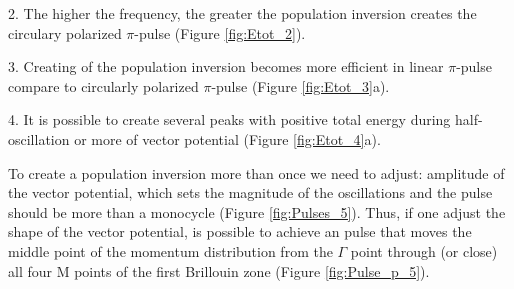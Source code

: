 2. The higher the frequency, the greater the population inversion creates the circulary polarized $\pi$-pulse (Figure \ref{fig:Etot_2}).

3. Creating of the population inversion becomes more efficient in linear $\pi$-pulse compare to circularly polarized $\pi$-pulse (Figure \ref{fig:Etot_3}a).

4. It is possible to create several peaks with positive total energy during half-oscillation or more of vector potential (Figure \ref{fig:Etot_4}a).

To create a population inversion more than once we need to adjust: amplitude of the vector potential, which sets the magnitude of the oscillations and the pulse should be more than a monocycle (Figure \ref{fig:Pulses_5}). Thus, if one adjust the shape of the vector potential, is possible to achieve an pulse that moves the middle point of the momentum distribution from the $\Gamma$ point through (or close) all four M points of the first Brillouin zone (Figure \ref{fig:Pulse_p_5}).
